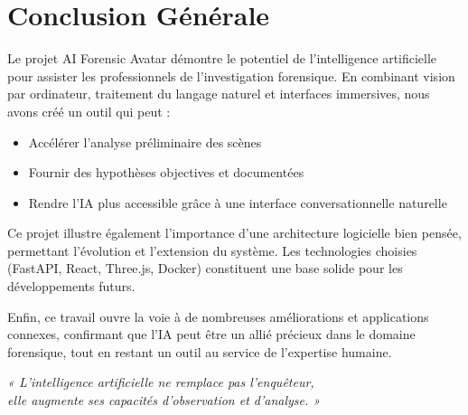 \section{Conclusion Générale}

Le projet AI Forensic Avatar démontre le potentiel de l'intelligence artificielle pour assister les professionnels de l'investigation forensique. En combinant vision par ordinateur, traitement du langage naturel et interfaces immersives, nous avons créé un outil qui peut :

\begin{itemize}
    \item Accélérer l'analyse préliminaire des scènes
    \item Fournir des hypothèses objectives et documentées
    \item Rendre l'IA plus accessible grâce à une interface conversationnelle naturelle
\end{itemize}

Ce projet illustre également l'importance d'une architecture logicielle bien pensée, permettant l'évolution et l'extension du système. Les technologies choisies (FastAPI, React, Three.js, Docker) constituent une base solide pour les développements futurs.

Enfin, ce travail ouvre la voie à de nombreuses améliorations et applications connexes, confirmant que l'IA peut être un allié précieux dans le domaine forensique, tout en restant un outil au service de l'expertise humaine.

\vspace{1cm}

\begin{flushright}
\textit{« L'intelligence artificielle ne remplace pas l'enquêteur,\\
elle augmente ses capacités d'observation et d'analyse. »}
\end{flushright}
